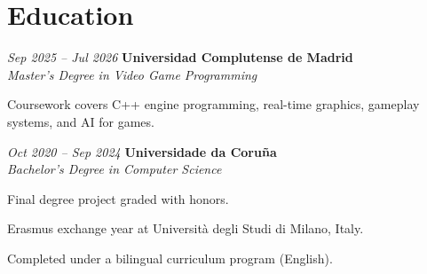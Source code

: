 \section{Education}

\begin{twocolentry}
{\textit{Sep 2025 – Jul 2026}}
\textbf{Universidad Complutense de Madrid} \\
\hspace*{2em}\textit{Master's Degree in Video Game Programming}
\end{twocolentry}

\vspace{0.2 cm}
\begin{onecolentry}
\begin{highlights}
\item Coursework covers C++ engine programming, real-time graphics, gameplay systems, and AI for games.
\end{highlights}
\end{onecolentry}

\vspace{0.2 cm}

\begin{twocolentry}{\textit{Oct 2020 – Sep 2024}}
\textbf{Universidade da Coruña} \\
\hspace*{2em}\textit{Bachelor's Degree in Computer Science}
\end{twocolentry}

\vspace{0.2 cm}
\begin{onecolentry}
\begin{highlights}
\item Final degree project graded with honors.
\item Erasmus exchange year at Università degli Studi di Milano, Italy.
\item Completed under a bilingual curriculum program (English).
\end{highlights}
\end{onecolentry}


